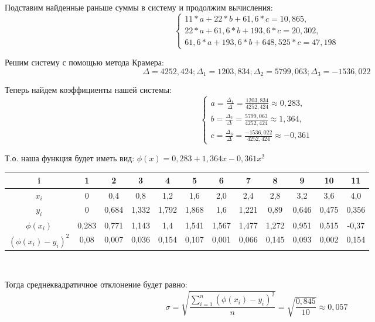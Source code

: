 \documentclass[12pt]{article}
\begin{document}
Подставим найденные раньше суммы в систему и продолжим вычисления:
\begin{equation}
  \begin{cases}
    11 * a + 22 * b + 61,6 * c = 10,865,\\
    22 * a + 61,6 * b + 193,6 * c = 20,302,\\
    61,6 * a + 193,6 * b + 648,525 * c = 47,198
  \end{cases}
\end{equation}

Решим систему с помощью метода Крамера:\\
\[ \Delta = 4252,424; \Delta_1 = 1203,834; \Delta_2 = 5799,063; \Delta_3 = -1536,022 \]

Теперь найдем коэффициенты нашей системы:
\begin{equation}
  \begin{cases}
    a = \frac{\Delta_1}{\Delta} = \frac{1203,834}{4252,424} \approx 0,283,\\
    b = \frac{\Delta_2}{\Delta} = \frac{5799,063}{4252,424} \approx 1,364,\\
    c = \frac{\Delta_3}{\Delta} = \frac{-1536,022}{4252,424} \approx -0,361
  \end{cases}
\end{equation}

Т.о. наша функция будет иметь вид: $\phi(x) = 0,283 + 1,364x - 0,361x^2$

\centering
\begin{tabular}{ |c|c|c|c|c|c|c|c|c|c|c|c| }
  \hline
  i & 1 & 2 & 3 & 4 & 5 & 6 & 7 & 8 & 9 & 10 & 11\\
  \hline
  $x_i$ & 0 & 0,4 & 0,8 & 1,2 & 1,6 & 2,0 & 2,4 & 2,8 & 3,2 & 3,6 & 4,0 \\
  \hline
  $y_i$ & 0 & 0,684 & 1,332 & 1,792 & 1,868 & 1,6 & 1,221 & 0,89 & 0,646 & 0,475 & 0,356 \\
  \hline
  $\phi(x_i)$ & 0,283 & 0,771 & 1,143 & 1,4 & 1,541 & 1,567 & 1,477 & 1,272 & 0,951 & 0,515 & -0,37 \\
  \hline
  $(\phi(x_i) - y_i)^2$ & 0,08 & 0,007 & 0,036 & 0,154 & 0,107 & 0,001 & 0,066 & 0,145 & 0,093 & 0,002 & 0,154 \\
  \hline
\end{tabular}\\
\raggedright
\vspace{5mm}
Тогда среднеквадратичное отклонение будет равно:
$$ \sigma = \sqrt{\frac{\sum_{i=1}^n (\phi(x_i) - y_i)^2}{n}} = \sqrt{\frac{0,845}{10}} \approx 0,057 $$
\end{document}
